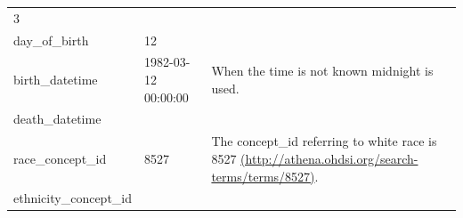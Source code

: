 \documentclass[]{book}
\begin{document}
\begin{longtable}[]{@{}lll@{}}
\begin{minipage}[t]{0.16\columnwidth}
3\strut
\end{minipage} & \begin{minipage}[t]{0.42\columnwidth}\raggedright\strut
\strut
\end{minipage}\tabularnewline
\begin{minipage}[t]{0.33\columnwidth}\raggedright\strut
day\_of\_birth\strut
\end{minipage} & \begin{minipage}[t]{0.16\columnwidth}\raggedright\strut
12\strut
\end{minipage} & \begin{minipage}[t]{0.42\columnwidth}\raggedright\strut
\strut
\end{minipage}\tabularnewline
\begin{minipage}[t]{0.33\columnwidth}\raggedright\strut
birth\_datetime\strut
\end{minipage} & \begin{minipage}[t]{0.16\columnwidth}\raggedright\strut
1982-03-12 00:00:00\strut
\end{minipage} & \begin{minipage}[t]{0.42\columnwidth}\raggedright\strut
When the time is not known midnight is used.\strut
\end{minipage}\tabularnewline
\begin{minipage}[t]{0.33\columnwidth}\raggedright\strut
death\_datetime\strut
\end{minipage} & \begin{minipage}[t]{0.16\columnwidth}\raggedright\strut
\strut
\end{minipage} & \begin{minipage}[t]{0.42\columnwidth}\raggedright\strut
\strut
\end{minipage}\tabularnewline
\begin{minipage}[t]{0.33\columnwidth}\raggedright\strut
race\_concept\_id\strut
\end{minipage} & \begin{minipage}[t]{0.16\columnwidth}\raggedright\strut
8527\strut
\end{minipage} & \begin{minipage}[t]{0.42\columnwidth}\raggedright\strut
The concept\_id referring to white race is 8527
\href{http://athena.ohdsi.org/search-terms/terms/8527}{(http://athena.ohdsi.org/search-terms/terms/8527)}.\strut
\end{minipage}\tabularnewline
\begin{minipage}[t]{0.33\columnwidth}\raggedright\strut
ethnicity\_concept\_id\strut

\end{minipage}
\end{longtable}
\end{document}
